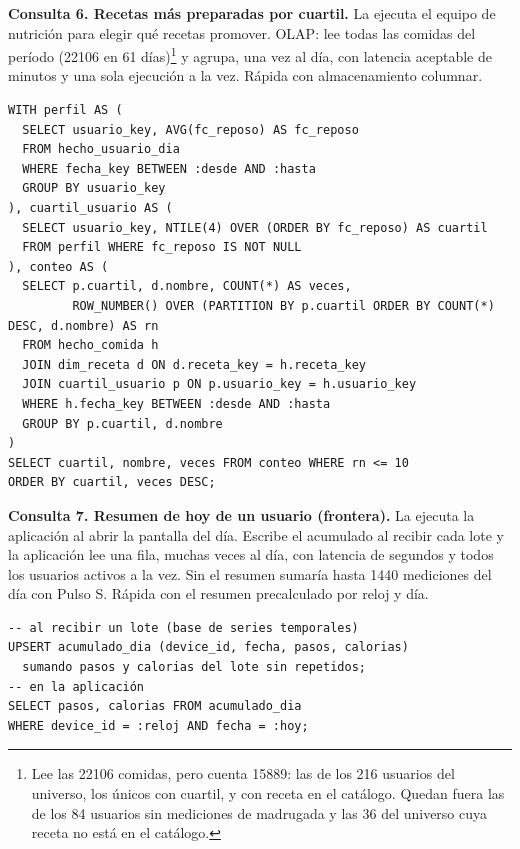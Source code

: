 \documentclass[11pt]{article}
\begin{document}
\par\noindent\begin{minipage}{\linewidth}\setlength{\parskip}{1ex}
\textbf{Consulta 6. Recetas más preparadas por cuartil.} La ejecuta el equipo
de nutrición para elegir qué recetas promover. OLAP: lee todas las comidas del período (22106 en 61 días)\footnote{Lee las 22106 comidas, pero cuenta 15889: las de los 216 usuarios del universo, los únicos con cuartil, y con receta en el catálogo. Quedan fuera las de los 84 usuarios sin mediciones de madrugada y las 36 del universo cuya receta no está en el catálogo.} y agrupa, una vez al día, con latencia aceptable de minutos y una sola ejecución a la vez. Rápida con almacenamiento
columnar.
\begin{lstlisting}
WITH perfil AS (
  SELECT usuario_key, AVG(fc_reposo) AS fc_reposo
  FROM hecho_usuario_dia
  WHERE fecha_key BETWEEN :desde AND :hasta
  GROUP BY usuario_key
), cuartil_usuario AS (
  SELECT usuario_key, NTILE(4) OVER (ORDER BY fc_reposo) AS cuartil
  FROM perfil WHERE fc_reposo IS NOT NULL
), conteo AS (
  SELECT p.cuartil, d.nombre, COUNT(*) AS veces,
         ROW_NUMBER() OVER (PARTITION BY p.cuartil ORDER BY COUNT(*) DESC, d.nombre) AS rn
  FROM hecho_comida h
  JOIN dim_receta d ON d.receta_key = h.receta_key
  JOIN cuartil_usuario p ON p.usuario_key = h.usuario_key
  WHERE h.fecha_key BETWEEN :desde AND :hasta
  GROUP BY p.cuartil, d.nombre
)
SELECT cuartil, nombre, veces FROM conteo WHERE rn <= 10
ORDER BY cuartil, veces DESC;
\end{lstlisting}\end{minipage}\par\medskip

\par\noindent\begin{minipage}{\linewidth}\setlength{\parskip}{1ex}
\textbf{Consulta 7. Resumen de hoy de un usuario (frontera).} La ejecuta la
aplicación al abrir la pantalla del día. Escribe el acumulado al recibir cada lote y la aplicación lee una fila, muchas veces al día, con latencia de segundos y todos los usuarios activos a la vez. Sin el resumen sumaría hasta 1440 mediciones del día con Pulso S. Rápida con el resumen precalculado por reloj y día.
\begin{lstlisting}
-- al recibir un lote (base de series temporales)
UPSERT acumulado_dia (device_id, fecha, pasos, calorias)
  sumando pasos y calorias del lote sin repetidos;
-- en la aplicación
SELECT pasos, calorias FROM acumulado_dia
WHERE device_id = :reloj AND fecha = :hoy;
\end{lstlisting}\end{minipage}\par\medskip
\end{document}
